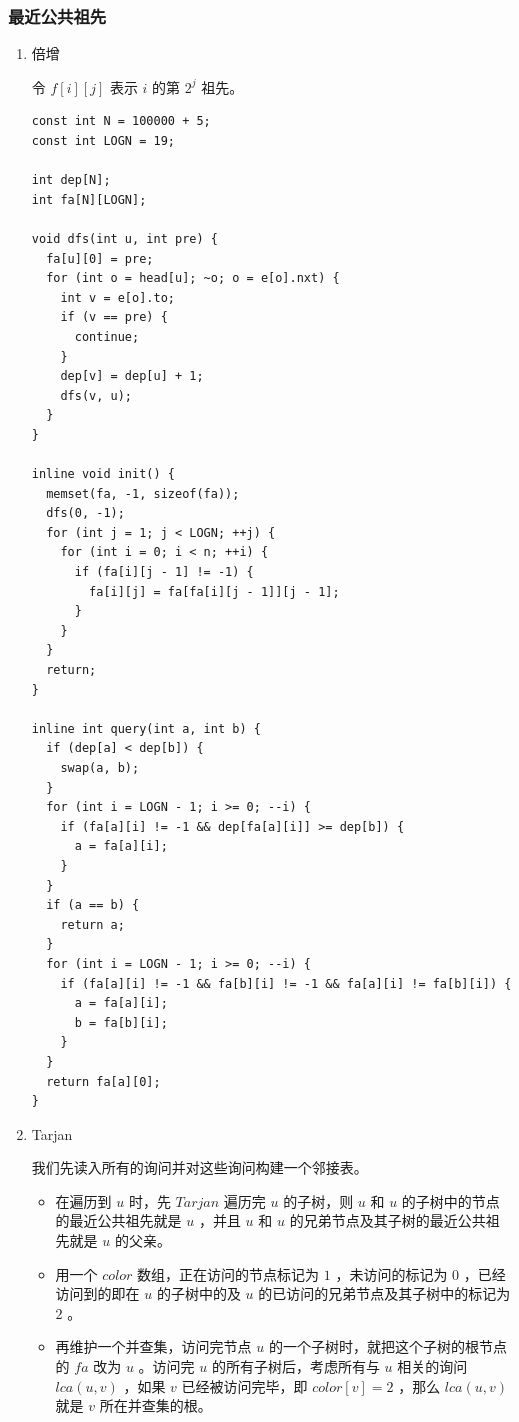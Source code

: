 \documentclass[11pt]{article}
\begin{document}
\subsubsection{最近公共祖先}
\label{sec-6-5-2}
\begin{enumerate}
\item 倍增
\label{sec-6-5-2-1}

令 $f[i][j]$ 表示 $i$ 的第 $2^j$ 祖先。

\begin{verbatim}
const int N = 100000 + 5;
const int LOGN = 19;

int dep[N];
int fa[N][LOGN];

void dfs(int u, int pre) {
  fa[u][0] = pre;
  for (int o = head[u]; ~o; o = e[o].nxt) {
    int v = e[o].to;
    if (v == pre) {
      continue;
    }
    dep[v] = dep[u] + 1;
    dfs(v, u);
  }
}

inline void init() {
  memset(fa, -1, sizeof(fa));
  dfs(0, -1);
  for (int j = 1; j < LOGN; ++j) {
    for (int i = 0; i < n; ++i) {
      if (fa[i][j - 1] != -1) {
        fa[i][j] = fa[fa[i][j - 1]][j - 1];
      }
    }
  }
  return;
}

inline int query(int a, int b) {
  if (dep[a] < dep[b]) {
    swap(a, b);
  }
  for (int i = LOGN - 1; i >= 0; --i) {
    if (fa[a][i] != -1 && dep[fa[a][i]] >= dep[b]) {
      a = fa[a][i];
    }
  }
  if (a == b) {
    return a;
  }
  for (int i = LOGN - 1; i >= 0; --i) {
    if (fa[a][i] != -1 && fa[b][i] != -1 && fa[a][i] != fa[b][i]) {
      a = fa[a][i];
      b = fa[b][i];
    }
  }
  return fa[a][0];
}
\end{verbatim}
\item Tarjan
\label{sec-6-5-2-2}

我们先读入所有的询问并对这些询问构建一个邻接表。

\begin{itemize}
\item 在遍历到 $u$ 时，先 $Tarjan$ 遍历完 $u$ 的子树，则 $u$ 和 $u$ 的子树中的节点的最近公共祖先就是 $u$ ，并且 $u$ 和 $u$ 的兄弟节点及其子树的最近公共祖先就是 $u$ 的父亲。
\item 用一个 $color$ 数组，正在访问的节点标记为 $1$ ，未访问的标记为 $0$ ，已经访问到的即在 $u$ 的子树中的及 $u$ 的已访问的兄弟节点及其子树中的标记为 $2$ 。
\item 再维护一个并查集，访问完节点 $u$ 的⼀个子树时，就把这个子树的根节点的 $fa$ 改为 $u$ 。访问完 $u$ 的所有子树后，考虑所有与 $u$ 相关的询问 $lca(u,v)$ ，如果 $v$ 已经被访问完毕，即 $color[v] = 2$ ，那么 $lca(u,v)$ 就是 $v$ 所在并查集的根。
\end{itemize}


\end{enumerate}
\end{document}
